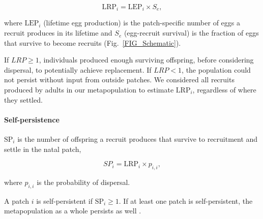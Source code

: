 \documentclass[12pt, oneside]{article}   	%
\begin{document}
\begin{equation}
\text{LRP}_i = \text{LEP}_i \times S_e, \label{EQN_LRP}
\end{equation}

where $\text{LEP}_i$ (lifetime egg production) is the patch-specific number of eggs a recruit produces in its lifetime and $S_e$ (egg-recruit survival) is the fraction of eggs that survive to become recruits (Fig.\ \ref{FIG_Schematic}).

If $LRP \geq 1$, individuals produced enough surviving offspring, before considering dispersal, to potentially achieve replacement. If $LRP < 1$, the population could not persist without input from outside patches. We considered all recruits produced by adults in our metapopulation to estimate $\text{LRP}_i$, regardless of where they settled. %

\paragraph*{Self-persistence} 

$\text{SP}_i$ is the number of offspring a recruit produces that survive to recruitment and settle in the natal patch,

\begin{equation}
SP_i = \text{LRP}_i \times p_{i,i}, \label{EQN_SP}  %
\end{equation}

where $p_{i,i}$ is the probability of dispersal.

A patch $i$ is self-persistent if $\text{SP}_i \geq 1$. If at least one patch is self-persistent, the metapopulation as a whole persists as well \citep{hastings_persistence_2006, burgess2014beyond}. 

\end{document}
